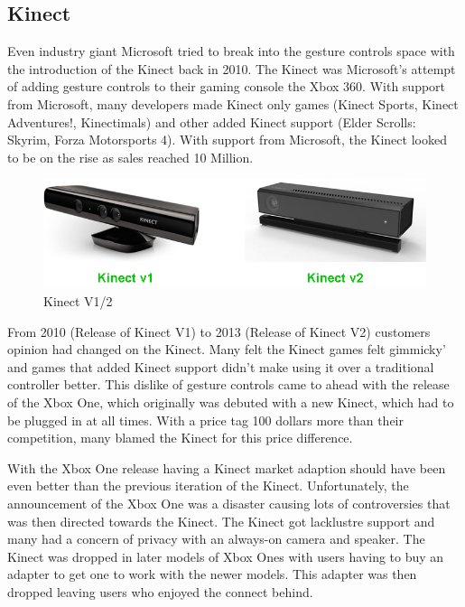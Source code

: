 \subsection{Kinect}

Even industry giant Microsoft tried to break into the gesture controls space with the introduction of the Kinect back in 2010. \cite{kinect} The Kinect was Microsoft's attempt of adding gesture controls to their gaming console the Xbox 360. With support from Microsoft, many developers made Kinect only games (Kinect Sports, Kinect Adventures!, Kinectimals) and other added Kinect support (Elder Scrolls: Skyrim, Forza Motorsports 4). With support from Microsoft, the Kinect looked to be on the rise as sales reached 10 Million. \cite{kinectsales}

\begin{figure}[H]
  \includegraphics[width=\linewidth]{img/Kinect.png}
  \caption{Kinect V1/2}
  \label{fig:KINECT}
\end{figure}

From 2010 (Release of Kinect V1) to 2013 (Release of Kinect V2) customers opinion had changed on the Kinect. Many felt the Kinect games felt gimmicky' and games that added Kinect support didn't make using it over a traditional controller better. This dislike of gesture controls came to ahead with the release of the Xbox One, which originally was debuted with a new Kinect, which had to be plugged in at all times. With a price tag 100 dollars more than their competition, many blamed the Kinect for this price difference. 

With the Xbox One release having a Kinect market adaption should have been even better than the previous iteration of the Kinect. Unfortunately, the announcement of the Xbox One was a disaster causing lots of controversies that was then directed towards the Kinect. The Kinect got lacklustre support and many had a concern of privacy with an always-on camera and speaker. The Kinect was dropped in later models of Xbox Ones with users having to buy an adapter to get one to work with the newer models. This adapter was then dropped leaving users who enjoyed the connect behind.

